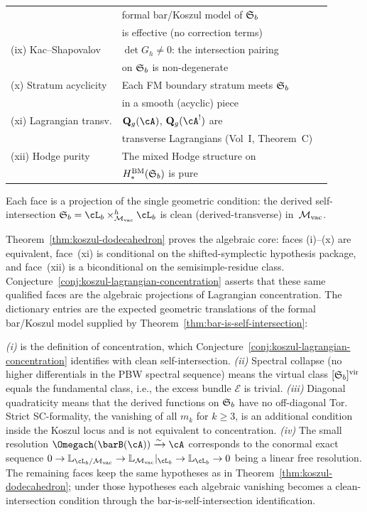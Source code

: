 \begin{conjecture}
\begin{center}
\begin{tabular}{@{}lll@{}}
 & formal bar/Koszul model of $\mathfrak{S}_b$ \\
 & is effective (no correction terms) \\
\textup{(ix)} Kac--Shapovalov &
 $\det G_h \neq 0$: the intersection pairing \\
 & on $\mathfrak{S}_b$ is non-degenerate \\
\textup{(x)} Stratum acyclicity &
 Each FM boundary stratum meets $\mathfrak{S}_b$ \\
 & in a smooth (acyclic) piece \\
\textup{(xi)} Lagrangian transv. &
 $\mathbf{Q}_g(\cA)$, $\mathbf{Q}_g(\cA^!)$ are \\
 & transverse Lagrangians (Vol~I, Theorem~C) \\
\textup{(xii)} Hodge purity &
 The mixed Hodge structure on \\
 & $H_*^{\mathrm{BM}}(\mathfrak{S}_b)$ is pure \\
\bottomrule
\end{tabular}
\end{center}
Each face is a projection of the single geometric condition:
the derived self-intersection $\Steinb_b = \cL_b \times_{\Mvac}^h
\cL_b$ is clean (derived-transverse) in~$\mathcal{M}_{\mathrm{vac}}$.
\end{conjecture}

\begin{remark}[Evidence]
Theorem~\ref{thm:koszul-dodecahedron} proves the algebraic core:
faces \textup{(i)--(x)} are equivalent, face~\textup{(xi)} is
conditional on the shifted-symplectic hypothesis package, and
face~\textup{(xii)} is a biconditional on the
semisimple-residue class. Conjecture~\ref{conj:koszul-lagrangian-concentration}
asserts that these same qualified faces are the algebraic projections
of Lagrangian concentration. The dictionary entries are the expected
geometric translations of the formal bar/Koszul model supplied by
Theorem~\ref{thm:bar-is-self-intersection}:

\emph{(i)} is the definition of concentration, which
Conjecture~\ref{conj:koszul-lagrangian-concentration} identifies with
clean self-intersection.
\emph{(ii)} Spectral collapse (no higher differentials in the PBW
spectral sequence) means the virtual class
$[\mathfrak{S}_b]^{\mathrm{vir}}$ equals the fundamental class, i.e.,
the excess bundle $\mathcal{E}$ is trivial.
\emph{(iii)} Diagonal quadraticity means that the derived functions on
$\mathfrak{S}_b$ have no off-diagonal Tor. Strict SC-formality, the
vanishing of all $m_k$ for $k \geq3$, is an additional condition inside
the Koszul locus and is not equivalent to concentration.
\emph{(iv)} The small resolution
$\Omegach(\barB(\cA)) \xrightarrow{\sim} \cA$ corresponds to
the conormal exact sequence
$0 \to \mathbb{L}_{\cL_b/\Mvac} \to \mathbb{L}_{\Mvac}|_{\cL_b}
\to \mathbb{L}_{\cL_b} \to 0$ being a linear free resolution.
The remaining faces keep the same hypotheses as in
Theorem~\ref{thm:koszul-dodecahedron}; under those hypotheses each
algebraic vanishing becomes a clean-intersection condition through the
bar-is-self-intersection identification.
\end{remark}


